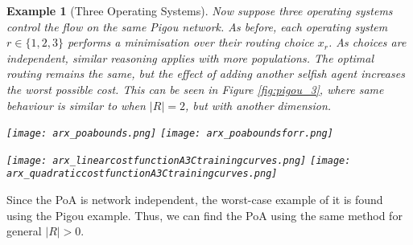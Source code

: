 \documentclass{article}
\newtheorem{example}{Example}
\begin{document}
 \begin{example}[Three Operating Systems] \label{ex:pigou3} 
    Now suppose three operating systems control the flow on the same Pigou network. As before, each operating system $r \in \{1,2,3\}$ performs a minimisation over their routing choice $x_r$. As choices are independent, similar reasoning applies with more populations. The optimal routing remains the same, but the effect of adding another selfish agent increases the worst possible cost. 
    This can be seen in Figure \ref{fig:pigou_3}, where same behaviour is similar to when $|R|=2$, but with another dimension. 
    \begin{figure*}[ht!]
    \centering
        \texttt{[image: arx\_poabounds.png]}
        \texttt{[image: arx\_poaboundsforr.png]}
        \caption{The Price of Anarchy for a network control game for various $p$ and $|R|$. }
        \label{fig:poa_pigou}
    \end{figure*}
       \begin{figure*}[ht!]
  	\centering
  	\texttt{[image: arx\_linearcostfunctionA3Ctrainingcurves.png]}
  	\texttt{[image: arx\_quadraticcostfunctionA3Ctrainingcurves.png]}
  	\caption{The learning curves for A3C agents playing a network control game on Braess' example for linear and quadratic edge costs.}
  	\label{fig:rl_poa}
  \end{figure*}

    \end{example}
    Since the PoA is network independent, the worst-case example of it is found using the Pigou example. %
    Thus, we can find the PoA using the same method for general $|R|>0$.
    
\end{document}
